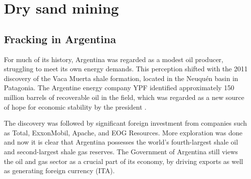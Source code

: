 \chapter{Dry sand mining}



\section{Fracking in Argentina}
For much of its history, Argentina was regarded as a modest oil producer, struggling to meet its own energy demands. This perception shifted with the 2011 discovery of the Vaca Muerta shale formation, located in the Neuquén basin in Patagonia. The Argentine energy company YPF identified approximately 150 million barrels of recoverable oil in the field, which was regarded as a new source of hope for economic stability by the president \cite{krau}.

The discovery was followed by significant foreign investment from companies such as Total, ExxonMobil, Apache, and EOG Resources. More exploration was done and now it is clear that Argentina possesses the world’s fourth-largest shale oil and second-largest shale gas reserves. The Government of Argentina still views the oil and gas sector as a crucial part of its economy, by driving exports as well as generating foreign currency (ITA).

